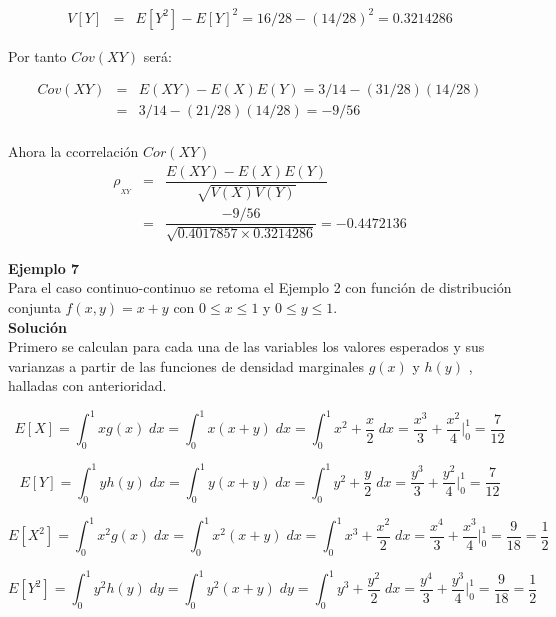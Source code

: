 \documentclass[base=hide,12pt]{elegantbook}
\begin{document}
\begin{eqnarray*}
	V[Y]&=&E[Y^{2}]-E[Y]^{2}= 16/28 - (14/28)^{2} = 0.3214286
\end{eqnarray*}	



Por tanto $Cov(XY)$ será:

\begin{eqnarray*}
	Cov(XY)&=&E(XY)-E(X)E(Y) =3/14-(31/28)(14/28)\\
	       &=& 3/14 - (21/28) (14/28) =  -9/56 \\
\end{eqnarray*}		

Ahora la ccorrelación $Cor(XY)$
\begin{eqnarray*}
	\rho_{_{XY}} &=&\dfrac{E(XY)-E(X)E(Y)}{\sqrt{V(X)V(Y)}} \\ 
	&=& \dfrac{-9/56}{\sqrt{0.4017857 \times 0.3214286}} = -0.4472136
\end{eqnarray*}	


\vspace{1cm}
\textcolor{col3}{\bf \large Ejemplo 7}\\

Para el caso continuo-continuo se retoma el Ejemplo 2 con función de distribución conjunta $f(x,y)=x+y$ con $0\leq x \leq 1$ y  $0\leq y \leq 1$. \\

\vspace{.5cm}
\textcolor{col3}{\bf \large Solución }\\


Primero se calculan para cada una de las variables los valores esperados y sus varianzas a partir de las funciones de densidad marginales $g(x)$ y $h(y)$ , halladas con anterioridad.

$$E[X]= \int_{0}^{1} x g(x) \;dx = \int_{0}^{1} x (x+y) \;dx = \int_{0}^{1} x^{2}+\dfrac{x}{2} \;dx = \dfrac{x^{3}}{3}+\dfrac{x^{2}}{4} \Bigg|_{0}^{1} = \dfrac{7}{12}$$   	

$$E[Y]= \int_{0}^{1} y h(y) \;dx = \int_{0}^{1} y (x+y) \;dx = \int_{0}^{1} y^{2}+\dfrac{y}{2} \;dx = \dfrac{y^{3}}{3}+\dfrac{y^{2}}{4} \Bigg|_{0}^{1} = \dfrac{7}{12}$$  	

$$E[X^{2}]= \int_{0}^{1} x^{2} g(x) \;dx = \int_{0}^{1} x^{2} (x+y) \;dx = \int_{0}^{1} x^{3}+\dfrac{x^{2}}{2} \;dx = \dfrac{x^{4}}{3}+\dfrac{x^{3}}{4} \Bigg|_{0}^{1} = \dfrac{9}{18} = \dfrac{1}{2}$$   	


$$E[Y^{2}]= \int_{0}^{1} y^{2} h(y) \;dy = \int_{0}^{1} y^{2} (x+y) \;dy = \int_{0}^{1} y^{3}+\dfrac{y^{2}}{2} \;dx = \dfrac{y^{4}}{3}+\dfrac{y^{3}}{4} \Bigg|_{0}^{1} = \dfrac{9}{18} = \dfrac{1}{2}$$   				
\end{document}
